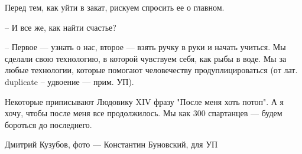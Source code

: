 Перед тем, как уйти в закат, рискуем спросить ее о главном.

– И все же, как найти счастье?

– Первое --- узнать о нас, второе --- взять ручку в руки и начать учиться. Мы
сделали свою технологию, в которой чувствуем себя, как рыбы в воде. Мы за любые
технологии, которые помогают человечеству продуплицироваться (от лат. duplicate
– удвоение --- прим. УП). 

Некоторые приписывают Людовику XIV фразу "После меня хоть потоп". А я хочу,
чтобы после меня все продолжилось. Мы как 300 спартанцев --- будем бороться до
последнего.

Дмитрий Кузубов, фото --- Константин Буновский, для УП
